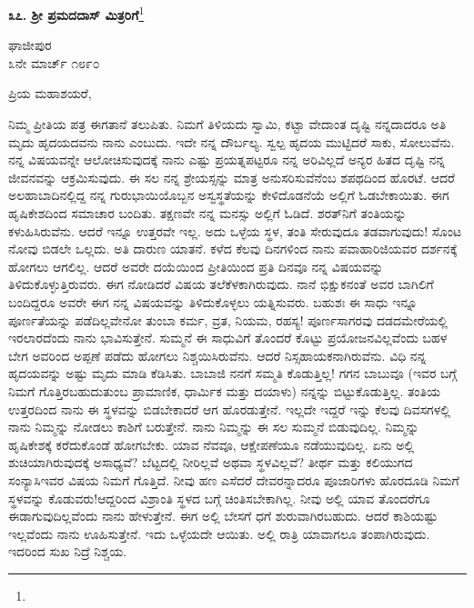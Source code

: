 \begin{center}
\textbf{೩೭. ಶ‍್ರೀ ಪ್ರಮದದಾಸ್ ಮಿತ್ರರಿಗೆ}\footnote{}
\end{center}
\vspace{-0.5cm}

\begin{flushright}
ಘಾಜೀಪುರ\\೩ನೇ ಮಾರ್ಚ್ ೧೮೯೦
\end{flushright}

\noindent
ಪ್ರಿಯ ಮಹಾಶಯರೆ,

ನಿಮ್ಮ ಪ್ರೀತಿಯ ಪತ್ರ ಈಗತಾನೆ ತಲುಪಿತು. ನಿಮಗೆ ತಿಳಿಯದು ಸ್ವಾಮಿ, ಕಟ್ಟಾ ವೇದಾಂತ ದೃಷ್ಟಿ ನನ್ನದಾದರೂ ಅತಿ ಮೃದು ಹೃದಯದವನು ನಾನು ಎಂಬುದು. ಇದೇ ನನ್ನ ದೌರ್ಬಲ್ಯ. ಸ್ವಲ್ಪ ಹೃದಯ ಮುಟ್ಟಿದರೆ ಸಾಕು, ಸೋಲುವೆನು. ನನ್ನ ವಿಷಯವನ್ನೇ ಆಲೋಚಿಸುವುದಕ್ಕೆ ನಾನು ಎಷ್ಟು ಪ್ರಯತ್ನಪಟ್ಟರೂ ನನ್ನ ಅರಿವಿಲ್ಲದೆ ಅನ್ಯರ ಹಿತದ ದೃಷ್ಟಿ ನನ್ನ ಜೀವನವನ್ನು ಆಕ್ರಮಿಸುವುದು. ಈ ಸಲ ನನ್ನ ಶ್ರೇಯಸ್ಸನ್ನು ಮಾತ್ರ ಅನುಸರಿಸುವೆನೆಂಬ ಶಪಥದಿಂದ ಹೊರಟೆ. ಆದರೆ ಅಲಹಾಬಾದಿನಲ್ಲಿದ್ದ ನನ್ನ ಗುರುಭಾಯಿಯೊಬ್ಬನ ಅಸ್ವಸ್ಥತೆಯನ್ನು ಕೇಳಿದೊಡನೆಯೆ ಅಲ್ಲಿಗೆ ಓಡಬೇಕಾಯಿತು. ಈಗ ಹೃಷಿಕೇಶದಿಂದ ಸಮಾಚಾರ ಬಂದಿತು. ತಕ್ಷಣವೇ ನನ್ನ ಮನಸ್ಸು ಅಲ್ಲಿಗೆ ಓಡಿದೆ. ಶರತ್‌ನಿಗೆ ತಂತಿಯನ್ನು ಕಳುಹಿಸಿರುವೆನು. ಆದರೆ ಇನ್ನೂ ಉತ್ತರವೇ ಇಲ್ಲ. ಅದು ಒಳ್ಳೆಯ ಸ್ಥಳ, ತಂತಿ ಸೇರುವುದೂ ತಡವಾಗುವುದು! ಸೊಂಟ ನೋವು ಬಿಡಲೇ ಒಲ್ಲದು. ಅತಿ ದಾರುಣ ಯಾತನೆ. ಕಳೆದ ಕೆಲವು ದಿನಗಳಿಂದ ನಾನು ಪವಾಹಾರಿಜಿಯವರ ದರ್ಶನಕ್ಕೆ ಹೋಗಲು ಆಗಲಿಲ್ಲ. ಆದರೆ ಅವರೇ ದಯೆಯಿಂದ ಪ್ರೀತಿಯಿಂದ ಪ್ರತಿ ದಿನವೂ ನನ್ನ ವಿಷಯವನ್ನು ತಿಳಿದುಕೊಳ್ಳುತ್ತಿರುವರು. ಈಗ ನೋಡಿದರೆ ವಿಷಯ ತಲೆಕೆಳಕಾಗಿರುವುದು. ನಾನೆ ಭಿಕ್ಷುಕನಂತೆ ಅವರ ಬಾಗಿಲಿಗೆ ಬಂದಿದ್ದರೂ ಅವರೇ ಈಗ ನನ್ನ ವಿಷಯವನ್ನು ತಿಳಿದುಕೊಳ್ಳಲು ಯತ್ನಿಸುವರು. ಬಹುಶಃ ಈ ಸಾಧು ಇನ್ನೂ ಪೂರ್ಣತೆಯನ್ನು ಪಡೆದಿಲ್ಲವೇನೋ \enginline{-} ತುಂಬಾ ಕರ್ಮ, ವ್ರತ, ನಿಯಮ, ರಹಸ್ಯ! ಪೂರ್ಣಸಾಗರವು ದಡದಮೇರೆಯಲ್ಲಿ ಇರಲಾರದೆಂದು ನಾನು ಭಾವಿಸುತ್ತೇನೆ. ಸುಮ್ಮನೆ ಈ ಸಾಧುವಿಗೆ ತೊಂದರೆ ಕೊಟ್ಟು ಪ್ರಯೋಜನವಿಲ್ಲವೆಂದು ಬಹಳ ಬೇಗ ಅವರಿಂದ ಅಪ್ಪಣೆ ಪಡೆದು ಹೋಗಲು ನಿಶ್ಚಯಿಸಿರುವೆನು. ಆದರೆ ನಿಸ್ಸಹಾಯಕನಾಗಿರುವೆನು. ವಿಧಿ ನನ್ನ ಹೃದಯವನ್ನು ಅಷ್ಟು ಮೃದು ಮಾಡಿ ಕೆಡಿಸಿತು. ಬಾಬಾಜಿ ನನಗೆ ಸಮ್ಮತಿ ಕೊಡುತ್ತಿಲ್ಲ! ಗಗನ ಬಾಬುವೂ (ಇವರ ಬಗ್ಗೆ ನಿಮಗೆ ಗೊತ್ತಿರಬಹುದು\enginline{-}ತುಂಬ ಪ್ರಾಮಾಣಿಕ, ಧಾರ್ಮಿಕ ಮತ್ತು ದಯಾಳು) ನನ್ನನ್ನು ಬಿಟ್ಟುಕೊಡುತ್ತಿಲ್ಲ. ತಂತಿಯ ಉತ್ತರದಿಂದ ನಾನು ಈ ಸ್ಥಳವನ್ನು ಬಿಡಬೇಕಾದರೆ ಆಗ ಹೊರಡುತ್ತೇನೆ. ಇಲ್ಲದೇ ಇದ್ದರೆ ಇನ್ನು ಕೆಲವು ದಿವಸಗಳಲ್ಲಿ ನಾನು ನಿಮ್ಮನ್ನು ನೋಡಲು ಕಾಶಿಗೆ ಬರುತ್ತೇನೆ. ನಾನು ನಿಮ್ಮನ್ನು ಈ ಸಲ ಸುಮ್ಮನೆ ಬಿಡುವುದಿಲ್ಲ. ನಿಮ್ಮನ್ನು ಹೃಷಿಕೇಶಕ್ಕೆ ಕರೆದುಕೊಂಡೆ ಹೋಗಬೇಕು. ಯಾವ ನೆವವೂ, ಆಕ್ಷೇಪಣೆಯೂ ನಡೆಯುವುದಿಲ್ಲ. ಏನು ಅಲ್ಲಿ ಶುಚಿಯಾಗಿರುವುದಕ್ಕೆ ಅಸಾಧ್ಯವೆ? ಬೆಟ್ಟದಲ್ಲಿ ನೀರಿಲ್ಲವೆ ಅಥವಾ ಸ್ಥಳವಿಲ್ಲವೆ? ತೀರ್ಥ ಮತ್ತು ಕಲಿಯುಗದ ಸಂನ್ಯಾಸಿ\enginline{-}ಇವರ ವಿಷಯ ನಿಮಗೆ ಗೊತ್ತಿದೆ. ನೀವು ಹಣ ಎಸೆದರೆ ದೇವರನ್ನಾದರೂ ಪೂಜಾರಿಗಳು ಹೊರದೂಡಿ ನಿಮಗೆ ಸ್ಥಳವನ್ನು ಕೊಡುವರು!ಆದ್ದರಿಂದ ವಿಶ್ರಾಂತಿ ಸ್ಥಳದ ಬಗ್ಗೆ ಚಿಂತಿಸಬೇಕಾಗಿಲ್ಲ. ನೀವು ಅಲ್ಲಿ ಯಾವ ತೊಂದರೆಗೂ ಈಡಾಗುವುದಿಲ್ಲವೆಂದು ನಾನು ಹೇಳುತ್ತೇನೆ. ಈಗ ಅಲ್ಲಿ ಬೇಸಗೆ ಧಗೆ ಶುರುವಾಗಿರಬಹುದು. ಆದರೆ ಕಾಶಿಯಷ್ಟು ಇಲ್ಲವೆಂದು ನಾನು ಊಹಿಸುತ್ತೇನೆ. ಇದು ಒಳ್ಳೆಯದೇ ಆಯಿತು. ಅಲ್ಲಿ ರಾತ್ರಿ ಯಾವಾಗಲೂ ತಂಪಾಗಿರುವುದು. ಇದರಿಂದ ಸುಖ ನಿದ್ರೆ ನಿಶ್ಚಯ.

